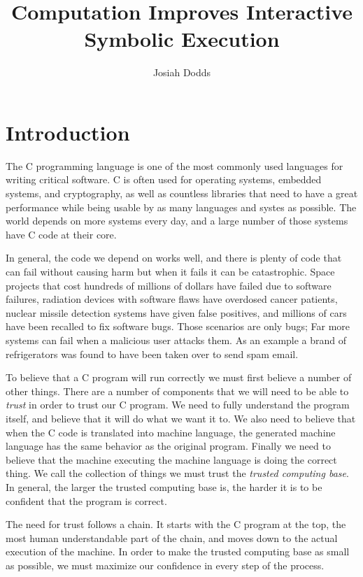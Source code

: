 \documentclass{puthesis}
\author{Josiah Dodds}
\title{Computation Improves Interactive Symbolic Execution}
\begin{document}
\chapter{Introduction}

The C programming language is one of the most commonly used languages
for writing critical software. C is often used for operating systems,
embedded systems, and cryptography, as well as countless libraries
that need to have a great performance while being usable by as many
languages and systes as possible. The world depends on more systems
every day, and a large number of those systems have C code at their core.

In general, the code we depend on works well, and there is plenty of
code that can fail without causing harm but when it fails it can be
catastrophic. Space projects that cost hundreds of millions of dollars
have failed due to software failures, radiation devices with software
flaws have overdosed cancer patients, nuclear missile detection
systems have given false positives, and millions of cars have been
recalled to fix software bugs. Those scenarios are only bugs; Far more
systems can fail when a malicious user attacks them. As an example
a brand of refrigerators was found to have been taken over to send
spam email. 

To believe that a C program will run correctly we must first believe a
number of other things. There are a number of components that we will
need to be able to \emph{trust} in order to trust our C program. We need
to fully understand the program itself, and believe that it will do
what we want it to. We also need to believe that when
the C code is translated into machine language, the generated machine
language has the same behavior as the original program. Finally we
need to believe that the machine executing the machine language is
doing the correct thing. We call the collection of things we must
trust the \emph{trusted computing base}. In general, the larger the
trusted computing base is, the harder it is to be confident that the
program is correct.

The need for trust follows a chain. It starts with the C program at
the top, the most human understandable part of the chain, and moves
down to the actual execution of the machine. In order to make the
trusted computing base as small as possible, we must maximize our
confidence in every step of the process.
\end{document}

